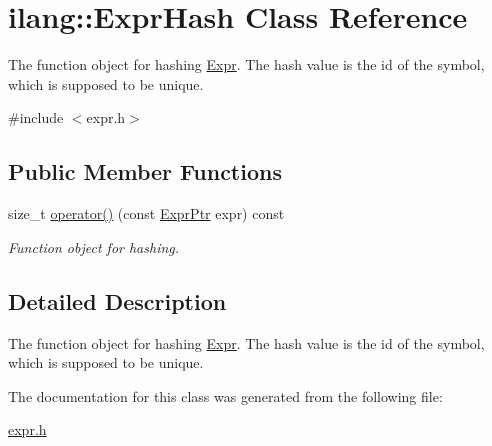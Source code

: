 \hypertarget{classilang_1_1_expr_hash}{}\section{ilang\+:\+:Expr\+Hash Class Reference}
\label{classilang_1_1_expr_hash}


The function object for hashing \mbox{\hyperlink{classilang_1_1_expr}{Expr}}. The hash value is the id of the symbol, which is supposed to be unique.  




{\ttfamily \#include $<$expr.\+h$>$}

\subsection*{Public Member Functions}
\begin{DoxyCompactItemize}
\item 
\mbox{\label{classilang_1_1_expr_hash_a8eac1c840bc6b5dda812635fe9273c37}} 
size\+\_\+t \mbox{\hyperlink{classilang_1_1_expr_hash_a8eac1c840bc6b5dda812635fe9273c37}{operator()}} (const \mbox{\hyperlink{namespaceilang_a7c4196c72e53ea4df4b7861af7bc3bce}{Expr\+Ptr}} expr) const
\begin{DoxyCompactList}\small\item\em Function object for hashing. \end{DoxyCompactList}\end{DoxyCompactItemize}


\subsection{Detailed Description}
The function object for hashing \mbox{\hyperlink{classilang_1_1_expr}{Expr}}. The hash value is the id of the symbol, which is supposed to be unique. 

The documentation for this class was generated from the following file\+:\begin{DoxyCompactItemize}
\item 
\mbox{\hyperlink{expr_8h}{expr.\+h}}\end{DoxyCompactItemize}
